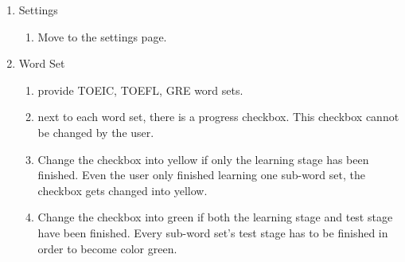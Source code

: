 \documentclass[conference]{IEEEtran}
\begin{document}
\begin{enumerate}
\begin{enumerate}
\begin{enumerate}
                \end{enumerate}
            \item Settings
                \begin{enumerate}
                    \item Move to the settings page.
                \end{enumerate}
            \item Word Set
                \begin{enumerate} 
                    \item provide TOEIC, TOEFL, GRE word sets.
                    \item next to each word set, there is a progress checkbox. This checkbox cannot be changed by the user.
                    \item Change the checkbox into yellow if only the learning stage has been finished. Even the user only finished learning one sub-word set, the checkbox gets changed into yellow.
                    \item Change the checkbox into green if both the learning stage and test stage have been finished. Every sub-word set's test stage has to be finished in order to become color green.
                \end{enumerate}

\end{enumerate}
\end{enumerate}
\end{document}
